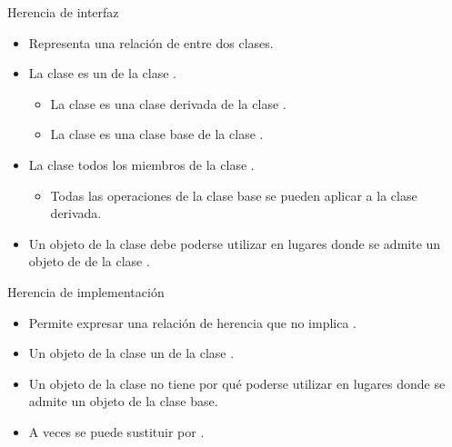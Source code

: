 \begin{frame}[t]{Herencia de interfaz}
\begin{itemize}
  \item Representa una relación de  entre dos clases.
  
  \item La clase  es un  de la clase .
    \begin{itemize}
      \item La clase  es una clase derivada de la clase .
      \item La clase  es una clase base de la clase .
    \end{itemize}

  \item La clase   todos los miembros
        de la clase .
    \begin{itemize}
      \item Todas las operaciones de la clase base se pueden aplicar a 
            la clase derivada.
    \end{itemize}

  \item Un objeto de la clase  debe poderse utilizar
        en lugares donde se admite un objeto de de la clase .
\end{itemize}
\end{frame}

\begin{frame}[t]{Herencia de implementación}
\begin{itemize}
  \item Permite expresar una relación de herencia que no implica .

  \item Un objeto de la clase  
         un 
        de la clase .

  \item Un objeto de la clase  no tiene por qué
        poderse utilizar en lugares donde se admite un objeto de la clase base.

  \item A veces se puede sustituir por .
\end{itemize}
\end{frame}
